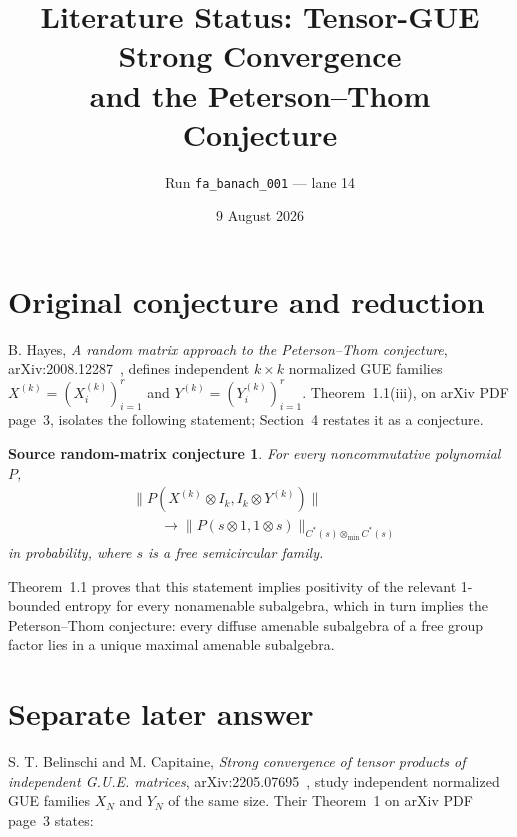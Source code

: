 \documentclass[11pt]{article}
\title{Literature Status: Tensor-GUE Strong Convergence\\and the Peterson--Thom Conjecture}
\author{Run \texttt{fa\_banach\_001} --- lane 14}
\date{9 August 2026}
\newtheorem*{question}{Source random-matrix conjecture}
\begin{document}
\maketitle

\begin{center}
\end{center}

\section{Original conjecture and reduction}

B. Hayes, \emph{A random matrix approach to the Peterson--Thom conjecture},
arXiv:2008.12287~\cite{source}, defines independent $k\times k$ normalized
GUE families $X^{(k)}=(X_i^{(k)})_{i=1}^r$ and
$Y^{(k)}=(Y_i^{(k)})_{i=1}^r$.  Theorem~1.1(iii), on arXiv PDF page~3,
isolates the following statement; Section~4 restates it as a conjecture.

\begin{question}
For every noncommutative polynomial $P$,
\[
 \begin{split}
 &\|P(X^{(k)}\otimes I_k,I_k\otimes Y^{(k)})\|\\
 &\qquad\longrightarrow
 \|P(s\otimes 1,1\otimes s)\|_{C^*(s)\otimes_{\min}C^*(s)}
 \end{split}
\]
in probability, where $s$ is a free semicircular family.
\end{question}

Theorem~1.1 proves that this statement implies positivity of the relevant
1-bounded entropy for every nonamenable subalgebra, which in turn implies the
Peterson--Thom conjecture: every diffuse amenable subalgebra of a free group
factor lies in a unique maximal amenable subalgebra.

\section{Separate later answer}

S. T. Belinschi and M. Capitaine,
\emph{Strong convergence of tensor products of independent G.U.E.
matrices}, arXiv:2205.07695~\cite{answerpaper}, study independent normalized
GUE families $X_N$ and $Y_N$ of the same size.  Their Theorem~1 on arXiv PDF
page~3 states:
\end{document}
